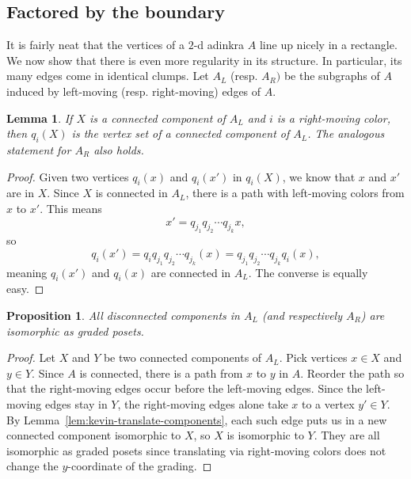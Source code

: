 \documentclass[12pt,twoside,singlespace]{article}
\numberwithin{equation}{section}
\newtheorem{lem}[equation]{Lemma}
\newtheorem{prop}[equation]{Proposition}
\theoremstyle{definition}
\begin{document}
\subsection{Factored by the boundary}

It is fairly neat that the vertices of a $2$-d adinkra $A$ line up nicely in a rectangle. We now show that there is even more regularity in its structure. In particular, its many edges come in identical clumps. Let $A_L$ (resp. $A_R)$ be the subgraphs of $A$ induced by left-moving (resp. right-moving) edges of $A$. %

\begin{lem}
\label{lem:kevin-translate-component}
If $X$ is a connected component of $A_L$ and $i$ is a right-moving color, then $q_i(X)$ is the vertex set of a connected component of $A_L$. The analogous statement for $A_R$ also holds.
\end{lem}
\begin{proof}
Given two vertices $q_i(x)$ and $q_i(x')$ in $q_i(X)$, we know that $x$ and $x'$ are in $X$. Since $X$ is connected in $A_L$, there is a path with left-moving colors from $x$ to $x'$. This means 
\[
x' = q_{j_1}q_{j_2}\cdots q_{j_k} x,
\]
so
\[
q_i (x') = q_i q_{j_1} q_{j_2} \cdots q_{j_k} (x) = q_{j_1} q_{j_2} \cdots q_{j_k} q_i (x),
\]
meaning $q_i(x')$ and $q_i(x)$ are connected in $A_L$. The converse is equally easy.
\end{proof}

\begin{prop}
\label{prop:kevin}
All disconnected components in $A_L$ (and respectively $A_R$) are isomorphic as graded posets.
\end{prop}
\begin{proof}
Let $X$ and $Y$ be two connected components of $A_L$. Pick vertices $x \in X$ and $y \in Y$. Since $A$ is connected, there is a path from $x$ to $y$ in $A$. Reorder the path so that the right-moving edges occur before the left-moving edges. Since the left-moving edges stay in $Y$, the right-moving edges alone take $x$ to a vertex $y' \in Y$. By Lemma~\ref{lem:kevin-translate-components}, each such edge puts us in a new connected component isomorphic to $X$, so $X$ is isomorphic to $Y$. They are all isomorphic as graded posets since translating via right-moving colors does not change the $y$-coordinate of the grading.
\end{proof}

\end{document}
